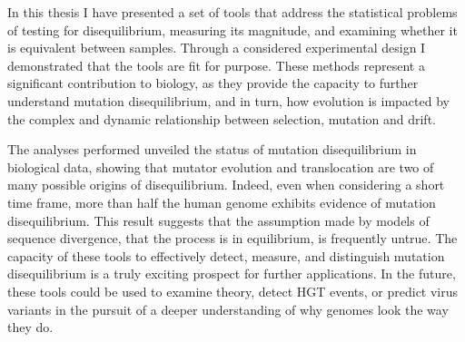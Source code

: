 In this thesis I have presented a set of tools that address the statistical problems of testing for disequilibrium, measuring its magnitude, and examining whether it is equivalent between samples. Through a considered experimental design I demonstrated that the tools are fit for purpose. These methods represent a significant contribution to biology, as they provide the capacity to further understand mutation disequilibrium, and in turn, how evolution is impacted by the complex and dynamic relationship between selection, mutation and drift. 

The analyses performed unveiled the status of mutation disequilibrium in biological data, showing that mutator evolution and translocation are two of many possible origins of disequilibrium. Indeed, even when considering a short time frame, more than half the human genome exhibits evidence of mutation disequilibrium. This result suggests that the assumption made by models of sequence divergence, that the process is in equilibrium, is frequently untrue. The capacity of these tools to effectively detect, measure, and distinguish mutation disequilibrium is a truly exciting prospect for further applications. In the future, these tools could be used to examine theory, detect HGT events, or predict virus variants in the pursuit of a deeper understanding of why genomes look the way they do. 